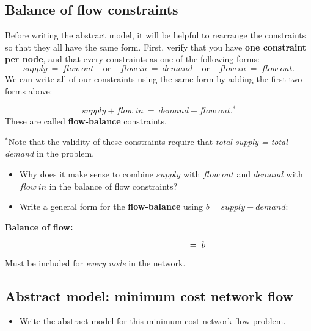 \documentclass[11pt]{article}
\theoremstyle{definition}
\begin{document}
\newpage
\subsection{Balance of flow constraints}
Before writing the abstract model, it will be helpful to rearrange the constraints so that they all have the same form.  First, verify that you have \textbf{one constraint per node}, and that every constraints as one of the following  forms:
\[
supply ~=~ flow~out  ~~~~~\text{or}~~~~~  flow~in ~=~ demand ~~~~~\text{or}~~~~~  flow~in ~=~ flow~out.
\]
We can write all of our constraints using the same form by adding the first two forms above:
\begin{tcolorbox}
\[
supply + flow~in ~=~ demand + flow~out.^*
\]
These are called \textbf{flow-balance} constraints.
\end{tcolorbox}
$^*$Note that the validity of these constraints require that \emph{total supply = total demand} in the problem. 

\begin{itemize}
\item Why does it make sense to combine $supply$ with $flow~out$ and $demand$ with $flow~in$ in the balance of flow constraints?
\vfill

\item Write a general form for the \textbf{flow-balance} using $b = supply - demand$:

\end{itemize}
\vfill
\begin{tcolorbox}
\textbf{Balance of flow:} 
\begin{center}
 $ \hspace{1.5in}  \hspace{1.5in} = ~ b$
 \end{center}
 Must be included for \emph{every node} in the network.
\end{tcolorbox}

\newpage


\subsection{Abstract model: minimum cost network flow}
\begin{itemize}
\item  Write the abstract model for this minimum cost network flow problem.  
\vfill \vfill
\end{itemize}
\end{document}
